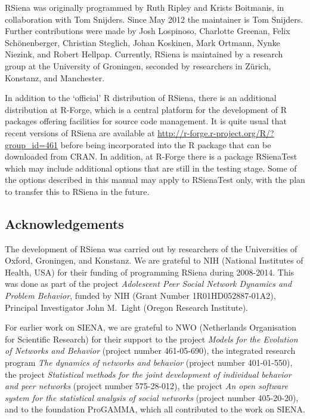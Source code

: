 \documentclass[a4paper,fleqn,11pt]{article}
\newcommand{\+}{\, + \,}
\newcommand{\R}{{\sf R }}
\newcommand{\rs}{{\sf RSiena}}
\newcommand{\RS}{{\sf RSiena }}
\newcommand{\si}{{\sf SIENA}}
\begin{document}
\RS was originally programmed by Ruth Ripley and Krists Boitmanis,
in collaboration with Tom Snijders.
Since May 2012 the maintainer is Tom Snijders.
Further contributions were made by Josh Lospinoso, Charlotte Greenan,
Felix Sch\"{o}nenberger,
Christian Steglich, Johan Koskinen, Mark Ortmann, Nynke Niezink,
and Robert Hellpap.
Currently, \RS is maintained by a research group
at the University of Groningen, seconded by researchers in Z\"{u}rich,
Konstanz, and Manchester.

In addition to the `official' \R distribution of \rs, there is
an additional distribution at R-Forge, which is
a central platform for the development of \R packages
offering facilities for source code management.
It is quite usual that recent versions of \RS are available at
\url{http://r-forge.r-project.org/R/?group_id=461}
before being incorporated into the R package that can be downloaded from CRAN.
In addition, at R-Forge there is a package {\sf RSienaTest} which may include
additional options that are still in the testing stage.
Some of the options described in this manual may apply to
{\sf RSienaTest} only, with the plan to transfer this to \RS
in the future.

\subsection{Acknowledgements}

The development of \RS was carried out by researchers of the Universities
of Oxford, Groningen, and Konstanz.
We are grateful to NIH (National Institutes of Health, USA)
for their funding of programming \RS during 2008-2014.
This was done
as part of the project \emph{Adolescent Peer Social Network Dynamics
and Problem Behavior}, funded by NIH (Grant Number 1R01HD052887-01A2),
Principal Investigator John M.\ Light (Oregon Research Institute).

For earlier work on \si, we are grateful to NWO (Netherlands Organisation for
Scientific Research) for their support to the project
\emph{Models for the Evolution of Networks and Behavior}
(project number 461-05-690),
the integrated research program
\emph{The dynamics of networks and behavior} (project number 401-01-550),
the project \emph{Statistical methods for the joint development of
individual behavior and peer networks} (project number 575-28-012),
the project \emph{An open software system for the statistical
analysis of social networks} (project number 405-20-20),
and to the foundation ProGAMMA,
which all contributed to the work on \si.
\end{document}
